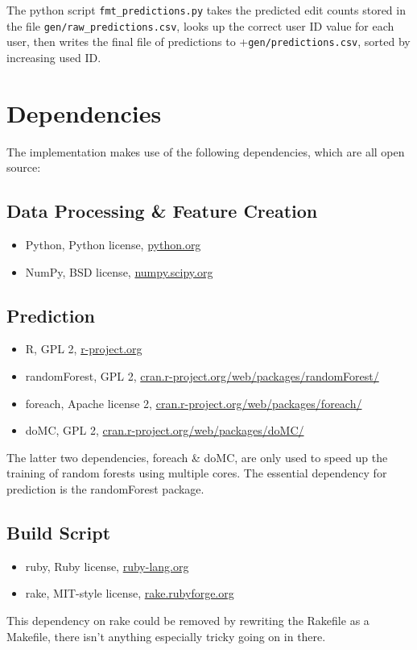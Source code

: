 \documentclass[12pt]{article}
\begin{document}
The python script \verb+fmt_predictions.py+ takes the predicted edit counts stored
in the file \verb+gen/raw_predictions.csv+, looks up the correct user ID value
for each user, then writes the final file of predictions to +\verb+gen/predictions.csv+,
sorted by increasing used ID.

\section{Dependencies}
The implementation makes use of the following dependencies, which are
all open source:
\subsection{Data Processing \& Feature Creation}
\begin{itemize}
	\item Python, Python license, \url{python.org}
	\item NumPy, BSD license, \url{numpy.scipy.org}
\end{itemize}
\subsection{Prediction}
\begin{itemize}
	\item R, GPL 2, \url{r-project.org}
	\item randomForest, GPL 2, \url{cran.r-project.org/web/packages/randomForest/}
	\item foreach, Apache license 2, \url{cran.r-project.org/web/packages/foreach/}
	\item doMC, GPL 2, \url{cran.r-project.org/web/packages/doMC/}
\end{itemize}
The latter two dependencies, foreach \& doMC, are only used to speed up the training of random forests using multiple cores. The essential dependency for prediction is the randomForest package.

\subsection{Build Script}
\begin{itemize}
	\item ruby, Ruby license, \url{ruby-lang.org}
	\item rake, MIT-style license, \url{rake.rubyforge.org}
\end{itemize}
This dependency on rake could be removed by rewriting the Rakefile as a Makefile, there isn't anything especially tricky going on in there.
\end{document}
